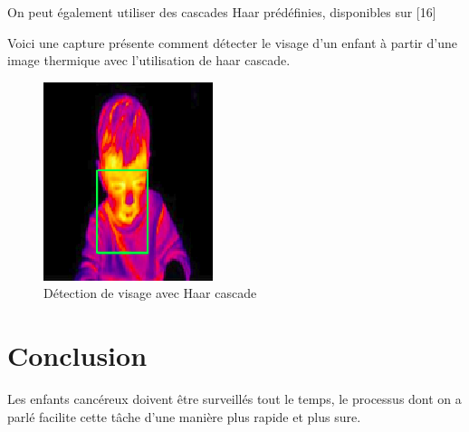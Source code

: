 \documentclass[12pt]{article}
\begin{document}
On peut également utiliser des cascades Haar prédéfinies, disponibles sur [16]

Voici une capture présente comment détecter le visage d'un enfant à partir d'une image thermique avec l'utilisation de haar cascade.
\begin{figure}[h]
	\centering
	\includegraphics[scale=1]{img-Chapiter-3/enfant.png}
	\caption{Détection de visage avec Haar cascade}
\end{figure}
\section{Conclusion}
Les enfants cancéreux doivent être surveillés tout le temps, le processus dont on a parlé facilite cette tâche d’une manière plus rapide et plus sure. 
\end{document}
